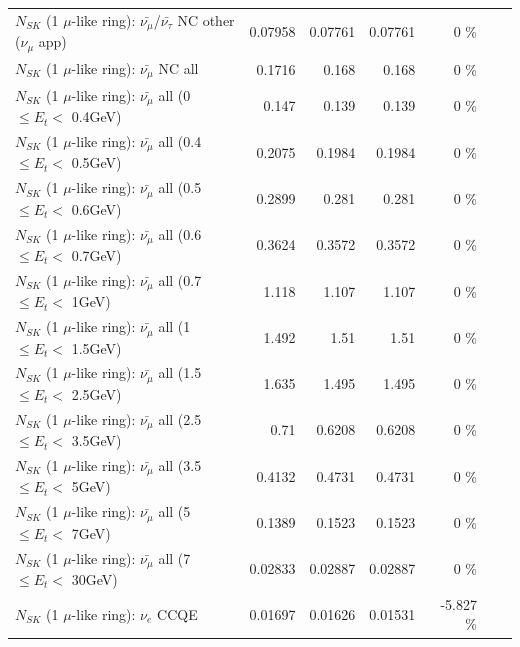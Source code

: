 \begin{table}
\begin{tabular}{| l | r | r | r  r | r  r |}
$N_{SK}$ (1 $\mu$-like ring): $\bar{\nu_\mu}$/$\bar{\nu_\tau}$ NC other ($\nu_\mu$ app) &         0.07958 &        0.07761 &        0.07761 &       0 \%  & & \\
                          $N_{SK}$ (1 $\mu$-like ring): $\bar{\nu_{\mu}}$ NC all &          0.1716 &          0.168 &          0.168 &       0 \%  & & \\
\hline
   $N_{SK}$ (1 $\mu$-like ring): $\bar{\nu_{\mu}}$ all (0 $\leq E_{t} <$ 0.4GeV) &           0.147 &          0.139 &          0.139 &       0 \%  & & \\
 $N_{SK}$ (1 $\mu$-like ring): $\bar{\nu_{\mu}}$ all (0.4 $\leq E_{t} <$ 0.5GeV) &          0.2075 &         0.1984 &         0.1984 &       0 \%  & & \\
 $N_{SK}$ (1 $\mu$-like ring): $\bar{\nu_{\mu}}$ all (0.5 $\leq E_{t} <$ 0.6GeV) &          0.2899 &          0.281 &          0.281 &       0 \%  & & \\
 $N_{SK}$ (1 $\mu$-like ring): $\bar{\nu_{\mu}}$ all (0.6 $\leq E_{t} <$ 0.7GeV) &          0.3624 &         0.3572 &         0.3572 &       0 \%  & & \\
   $N_{SK}$ (1 $\mu$-like ring): $\bar{\nu_{\mu}}$ all (0.7 $\leq E_{t} <$ 1GeV) &           1.118 &          1.107 &          1.107 &       0 \%  & & \\
   $N_{SK}$ (1 $\mu$-like ring): $\bar{\nu_{\mu}}$ all (1 $\leq E_{t} <$ 1.5GeV) &           1.492 &           1.51 &           1.51 &       0 \%  & & \\
 $N_{SK}$ (1 $\mu$-like ring): $\bar{\nu_{\mu}}$ all (1.5 $\leq E_{t} <$ 2.5GeV) &           1.635 &          1.495 &          1.495 &       0 \%  & & \\
 $N_{SK}$ (1 $\mu$-like ring): $\bar{\nu_{\mu}}$ all (2.5 $\leq E_{t} <$ 3.5GeV) &            0.71 &         0.6208 &         0.6208 &       0 \%  & & \\
   $N_{SK}$ (1 $\mu$-like ring): $\bar{\nu_{\mu}}$ all (3.5 $\leq E_{t} <$ 5GeV) &          0.4132 &         0.4731 &         0.4731 &       0 \%  & & \\
     $N_{SK}$ (1 $\mu$-like ring): $\bar{\nu_{\mu}}$ all (5 $\leq E_{t} <$ 7GeV) &          0.1389 &         0.1523 &         0.1523 &       0 \%  & & \\
    $N_{SK}$ (1 $\mu$-like ring): $\bar{\nu_{\mu}}$ all (7 $\leq E_{t} <$ 30GeV) &         0.02833 &        0.02887 &        0.02887 &       0 \%  & & \\
\hline
\hline
\hline
                                      $N_{SK}$ (1 $\mu$-like ring): $\nu_e$ CCQE &         0.01697 &        0.01626 &        0.01531 &  -5.827 \%  & & \\

\end{tabular}
\end{table}
